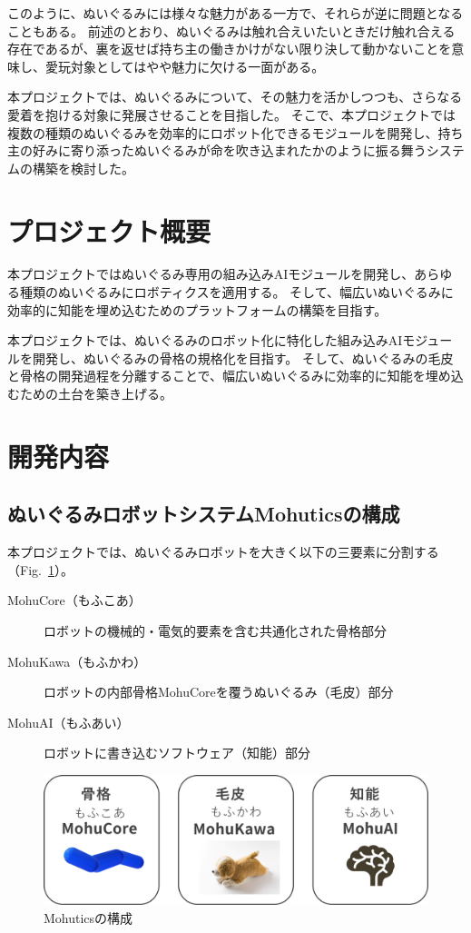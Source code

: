 \documentclass[uplatex,a4paper,12pt]{jsarticle}
\renewcommand{\figurename}{Fig.}
\newcommand{\figref}[1]{\figurename~\ref{#1}}
\begin{document}
このように、ぬいぐるみには様々な魅力がある一方で、それらが逆に問題となることもある。
前述のとおり、ぬいぐるみは触れ合えいたいときだけ触れ合える存在であるが、裏を返せば持ち主の働きかけがない限り決して動かないことを意味し、愛玩対象としてはやや魅力に欠ける一面がある。

本プロジェクトでは、ぬいぐるみについて、その魅力を活かしつつも、さらなる愛着を抱ける対象に発展させることを目指した。
そこで、本プロジェクトでは複数の種類のぬいぐるみを効率的にロボット化できるモジュールを開発し、持ち主の好みに寄り添ったぬいぐるみが命を吹き込まれたかのように振る舞うシステムの構築を検討した。



\section{プロジェクト概要}
本プロジェクトではぬいぐるみ専用の組み込みAIモジュールを開発し、あらゆる種類のぬいぐるみにロボティクスを適用する。
そして、幅広いぬいぐるみに効率的に知能を埋め込むためのプラットフォームの構築を目指す。

本プロジェクトでは、ぬいぐるみのロボット化に特化した組み込みAIモジュールを開発し、ぬいぐるみの骨格の規格化を目指す。
そして、ぬいぐるみの毛皮と骨格の開発過程を分離することで、幅広いぬいぐるみに効率的に知能を埋め込むための土台を築き上げる。

\section{開発内容}
\subsection{ぬいぐるみロボットシステムMohuticsの構成}
本プロジェクトでは、ぬいぐるみロボットを大きく以下の三要素に分割する（\figref{fig:mohutics:concept}）。
\begin{description}
  \item[MohuCore（もふこあ）] ロボットの機械的・電気的要素を含む共通化された骨格部分
  \item[MohuKawa（もふかわ）] ロボットの内部骨格MohuCoreを覆うぬいぐるみ（毛皮）部分
  \item[MohuAI（もふあい）] ロボットに書き込むソフトウェア（知能）部分
\end{description}

\begin{figure}[htbp]
  \centering
  \includegraphics[width=12cm]{images/mohutics/concept.png}
  \caption{Mohuticsの構成}
  \label{fig:mohutics:concept}
\end{figure}
\end{document}
